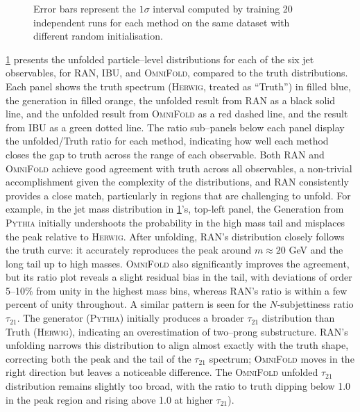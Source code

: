 {{\begin{figure}
{    Error bars represent the \(1\sigma\) interval computed by training 20 independent runs for each method on the same dataset with different random initialisation.}
    \label{fig:particle-level-distribution}
\end{figure}
            \cref{fig:particle-level-distribution} presents the unfolded particle--level distributions for each of the six jet observables, for RAN, IBU, and \textsc{OmniFold}, compared to the truth distributions.
            Each panel shows the truth spectrum (\textsc{Herwig}, treated as ``Truth'') in filled blue, the generation in filled orange, the unfolded result from RAN as a black solid line, and the unfolded result from \textsc{OmniFold} as a red dashed line, and the result from IBU as a green dotted line.
            The ratio sub--panels below each panel display the unfolded/Truth ratio for each method, indicating how well each method closes the gap to truth across the range of each observable.
            Both RAN and \textsc{OmniFold} achieve good agreement with truth across all observables, a non-trivial accomplishment given the complexity of the distributions, and RAN consistently provides a close match, particularly in regions that are challenging to unfold.
            For example, in the jet mass distribution in \cref{fig:particle-level-distribution}'s, top-left panel, the Generation from \textsc{Pythia} initially undershoots the probability in the high mass tail and misplaces the peak relative to \textsc{Herwig}.
            After unfolding, RAN’s distribution closely follows the truth curve: it accurately reproduces the peak around $m\approx 20$ GeV and the long tail up to high masses. \textsc{OmniFold} also significantly improves the agreement, but its ratio plot reveals a slight residual bias in the tail, with deviations of order 5–10\% from unity in the highest mass bins, whereas RAN’s ratio is within a few percent of unity throughout.
            A similar pattern is seen for the $N$-subjettiness ratio $\tau_{21}$.
            The generator (\textsc{Pythia}) initially produces a broader $\tau_{21}$ distribution than Truth (\textsc{Herwig}), indicating an overestimation of two--prong substructure.
            RAN’s unfolding narrows this distribution to align almost exactly with the truth shape, correcting both the peak and the tail of the $\tau_{21}$ spectrum; \textsc{OmniFold} moves in the right direction but leaves a noticeable difference.
            The \textsc{OmniFold} unfolded $\tau_{21}$ distribution remains slightly too broad, with the ratio to truth dipping below 1.0 in the peak region and rising above 1.0 at higher $\tau_{21}$).
            
}}
